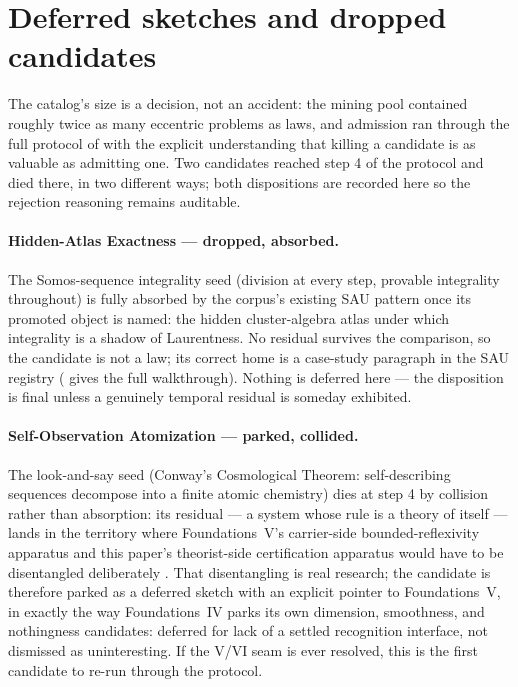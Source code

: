 \documentclass[11pt]{article}
\newcommand{\FoundIV}{Foundations~IV}
\theoremstyle{definition}
\begin{document}
\section{Deferred sketches and dropped candidates}\label{sec:sketches}

The catalog's size is a decision, not an accident: the mining pool contained roughly twice as many
eccentric problems as laws, and admission ran through the full protocol of 
with the explicit understanding that killing a candidate is as valuable as admitting one. Two
candidates reached step 4 of the protocol and died there, in two different ways; both dispositions
are recorded here so the rejection reasoning remains auditable.

\paragraph{Hidden-Atlas Exactness --- dropped, absorbed.} The Somos-sequence integrality seed
(division at every step, provable integrality throughout) is fully absorbed by the corpus's existing
SAU pattern once its promoted object is named: the hidden cluster-algebra atlas under which
integrality is a shadow of Laurentness. No residual survives the comparison, so the candidate is not
a law; its correct home is a case-study paragraph in the SAU registry
( gives the full walkthrough). Nothing is deferred here --- the disposition is
final unless a genuinely temporal residual is someday exhibited.

\paragraph{Self-Observation Atomization --- parked, collided.} The look-and-say seed (Conway's
Cosmological Theorem: self-describing sequences decompose into a finite atomic chemistry) dies at
step 4 by collision rather than absorption: its residual --- a system whose rule is a theory of
itself --- lands in the territory where Foundations~V's carrier-side bounded-reflexivity apparatus
and this paper's theorist-side certification apparatus would have to be disentangled deliberately
\citep{FoundationsVCognition}. That disentangling is real research; the candidate is therefore
parked as a deferred sketch with an explicit pointer to Foundations~V, in exactly the way
\FoundIV{} parks its own dimension, smoothness, and nothingness candidates: deferred for lack of a
settled recognition interface, not dismissed as uninteresting. If the V/VI seam is ever resolved,
this is the first candidate to re-run through the protocol.
\end{document}
